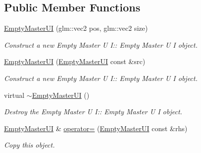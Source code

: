 \subsection*{Public Member Functions}
\begin{DoxyCompactItemize}
\item 
\hyperlink{class_empty_master_u_i_a05ceb1a35f5a442df0a45dd4f40da8c7}{Empty\+Master\+UI} (glm\+::vec2 pos, glm\+::vec2 size)
\begin{DoxyCompactList}\small\item\em Construct a new Empty Master U I\+:\+: Empty Master U I object. \end{DoxyCompactList}\item 
\hyperlink{class_empty_master_u_i_aeac8276dd686dff08fd2e75828a421e5}{Empty\+Master\+UI} (\hyperlink{class_empty_master_u_i}{Empty\+Master\+UI} const \&src)
\begin{DoxyCompactList}\small\item\em Construct a new Empty Master U I\+:\+: Empty Master U I object. \end{DoxyCompactList}\item 
\mbox{\label{class_empty_master_u_i_a2ed5921e74b801abc660a51f32e28d93}} 
virtual \hyperlink{class_empty_master_u_i_a2ed5921e74b801abc660a51f32e28d93}{$\sim$\+Empty\+Master\+UI} ()
\begin{DoxyCompactList}\small\item\em Destroy the Empty Master U I\+:\+: Empty Master U I object. \end{DoxyCompactList}\item 
\hyperlink{class_empty_master_u_i}{Empty\+Master\+UI} \& \hyperlink{class_empty_master_u_i_ad3666784fd24f54ec7e4c0e8002fc423}{operator=} (\hyperlink{class_empty_master_u_i}{Empty\+Master\+UI} const \&rhs)
\begin{DoxyCompactList}\small\item\em Copy this object. \end{DoxyCompactList}\end{DoxyCompactItemize}
